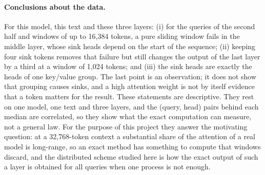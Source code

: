 \paragraph{Conclusions about the data.}
For this model, this text and these three layers: (i) for the queries of the second
half and windows of up to 16{,}384 tokens, a pure sliding window fails in the middle
layer, whose sink heads depend on the start of the sequence; (ii) keeping four
sink tokens removes that failure but still changes the output of the last layer by
a third at a window of 1{,}024 tokens; and (iii) the sink heads are exactly the
heads of one key/value group. The last point is an observation; it does not show
that grouping causes sinks, and a high attention weight is not by itself evidence
that a token matters for the result. These statements are descriptive. They rest
on one model, one text and three layers, and the (query, head) pairs behind each
median are correlated, so they show what the exact computation can measure, not a
general law. For the purpose of this project they answer the motivating question:
at a 32{,}768-token context a substantial share of the attention of a real model
is long-range, so an exact method has something to compute that windows discard,
and the distributed scheme studied here is how the exact output of such a layer
is obtained for all queries when one process is not enough.
